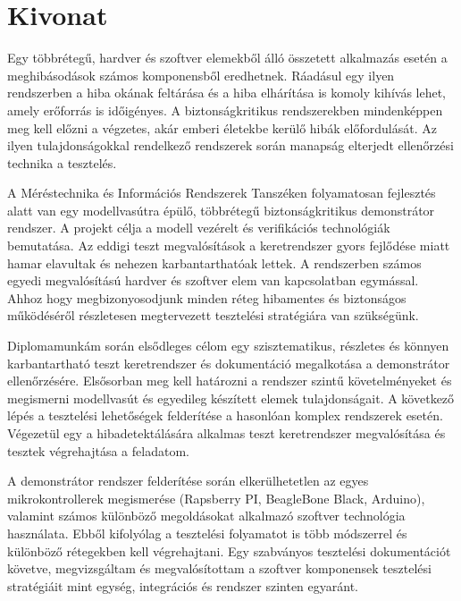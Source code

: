 \setcounter{page}{1}

\selecthungarian

\chapter*{Kivonat}

Egy többrétegű, hardver és szoftver elemekből álló összetett alkalmazás esetén a meghibásodások számos komponensből eredhetnek. Ráadásul egy ilyen rendszerben a hiba okának feltárása és a hiba elhárítása is komoly kihívás lehet, amely erőforrás is időigényes. A biztonságkritikus rendszerekben mindenképpen meg kell előzni a végzetes, akár emberi életekbe kerülő hibák előfordulását. Az ilyen tulajdonságokkal rendelkező rendszerek során manapság elterjedt ellenőrzési technika a tesztelés.

A Méréstechnika és Információs Rendszerek Tanszéken folyamatosan fejlesztés alatt van egy modellvasútra épülő, többrétegű biztonságkritikus demonstrátor rendszer. A projekt célja a modell vezérelt és verifikációs technológiák bemutatása. Az eddigi teszt megvalósítások a keretrendszer gyors fejlődése miatt hamar elavultak és nehezen karbantarthatóak lettek. A rendszerben számos egyedi megvalósítású hardver és szoftver elem van kapcsolatban egymással. Ahhoz hogy megbizonyosodjunk minden réteg hibamentes és biztonságos működéséről részletesen megtervezett tesztelési stratégiára van szükségünk.

Diplomamunkám során elsődleges célom egy szisztematikus, részletes és könnyen karbantartható teszt keretrendszer és dokumentáció megalkotása a demonstrátor ellenőrzésére. Elsősorban meg kell határozni a rendszer szintű követelményeket és megismerni modellvasút és egyedileg készített elemek tulajdonságait. A következő lépés a tesztelési lehetőségek felderítése a hasonlóan komplex rendszerek esetén. Végezetül egy a hibadetektálására alkalmas teszt keretrendszer megvalósítása és tesztek végrehajtása a feladatom.

A demonstrátor rendszer felderítése során elkerülhetetlen az egyes mikrokontrollerek megismerése (Rapsberry PI, BeagleBone Black, Arduino), valamint számos különböző megoldásokat alkalmazó szoftver technológia használata. Ebből kifolyólag a tesztelési folyamatot is több módszerrel és különböző rétegekben kell végrehajtani. Egy szabványos tesztelési dokumentációt követve, megvizsgáltam és megvalósítottam a szoftver komponensek tesztelési stratégiáit mint egység, integrációs és rendszer szinten egyaránt.

